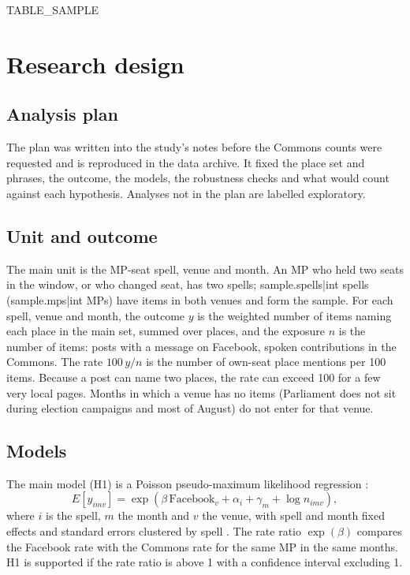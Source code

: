 \documentclass[11pt,a4paper]{article}
\begin{document}
{{TABLE_SAMPLE}}

\section{Research design}\label{sec:design}
\subsection{Analysis plan}
The plan was written into the study's notes before the Commons counts were requested and is reproduced in the data archive. It fixed the place set and phrases, the outcome, the models, the robustness checks and what would count against each hypothesis. Analyses not in the plan are labelled exploratory.

\subsection{Unit and outcome}
The main unit is the MP-seat spell, venue and month. An MP who held two seats in the window, or who changed seat, has two spells; {{sample.spells|int}} spells ({{sample.mps|int}} MPs) have items in both venues and form the sample. For each spell, venue and month, the outcome $y$ is the weighted number of items naming each place in the main set, summed over places, and the exposure $n$ is the number of items: posts with a message on Facebook, spoken contributions in the Commons. The rate $100\,y/n$ is the number of own-seat place mentions per 100 items. Because a post can name two places, the rate can exceed 100 for a few very local pages. Months in which a venue has no items (Parliament does not sit during election campaigns and most of August) do not enter for that venue.

\subsection{Models}
The main model (H1) is a Poisson pseudo-maximum likelihood regression \citep{santos2006,correia2020}:
\begin{equation}
E[y_{imv}] = \exp(\beta\,\mathrm{Facebook}_v + \alpha_i + \gamma_m + \log n_{imv}),
\end{equation}
where $i$ is the spell, $m$ the month and $v$ the venue, with spell and month fixed effects and standard errors clustered by spell \citep{cameron2015,abadie2023}. The rate ratio $\exp(\beta)$ compares the Facebook rate with the Commons rate for the same MP in the same months. H1 is supported if the rate ratio is above 1 with a confidence interval excluding 1.
\end{document}

